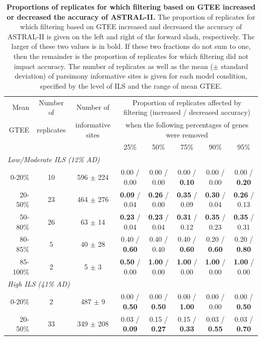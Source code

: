 \begin{landscape}
\begin{table}[!h]
\caption{{\bf Proportions of replicates for which filtering based on GTEE increased or decreased the accuracy of ASTRAL-II.} The proportion of replicates for which filtering based on GTEE increased and decreased the accuracy of ASTRAL-II is given on the left and right of the forward slash, respectively. The larger of these two values is in bold. If these two fractions do not sum to one, then the remainder is the proportion of replicates for which filtering did not impact accuracy. The number of replicates as well as the mean ($\pm$ standard deviation) of parsimony informative sites is given for each model condition, specified by the level of ILS and the range of mean GTEE.
}\label{tab:include-2}
\centering
\footnotesize
\begin{tabular}{rc cccccc}
\toprule
Mean & Number of & Number of & \multicolumn{5}{c}{Proportion of replicates affected by filtering (increased / decreased accuracy)} \\[0.5ex]
GTEE & replicates & informative sites & \multicolumn{5}{c}{when the following percentages of genes were removed}\\\cmidrule{4-8}
& & & 25\% & 50\% & 75\% & 90\% & 95\% \\
\midrule
\multicolumn{8}{l}{\em Low/Moderate ILS (12\% AD)}\\[0.5ex]
0-20\%  & 10 & 596 $\pm$ 224  & 0.00 / 0.00 & 0.00 / 0.00 & 0.00 / {\bf 0.10} & 0.00 / 0.00 & 0.00 / {\bf 0.20} \\[0.5ex]
20-50\%  & 23 & 464 $\pm$ 276  & {\bf 0.09} / 0.04 & {\bf 0.26} / 0.00 & {\bf 0.35} / 0.09 & {\bf 0.30} / 0.04 & {\bf 0.26} / 0.13 \\[0.5ex]
50-80\%  & 26 & 63 $\pm$ 14  & {\bf 0.23} / 0.04 & {\bf 0.23} / 0.04 & {\bf 0.31} / 0.12 & {\bf 0.35} / 0.23 & {\bf 0.35} / 0.31 \\[0.5ex]
80-85\%  & 5 & 40 $\pm$ 28  & 0.40 / {\bf 0.60} & 0.40 / 0.40 & 0.40 / {\bf 0.60} & 0.20 / {\bf 0.60} & 0.20 / {\bf 0.80} \\[0.5ex]
85-100\%  & 2 & 5 $\pm$ 3  & {\bf 0.50} / 0.00 & {\bf 1.00} / 0.00 & {\bf 1.00} / 0.00 & {\bf 1.00} / 0.00 & {\bf 1.00} / 0.00 \\[2ex]
\multicolumn{8}{l}{\em High ILS (41\% AD)}\\[0.5ex]
0-20\%  & 2 & 487 $\pm$ 9  & 0.00 / {\bf 0.50} & 0.00 / {\bf 0.50} & 0.00 / {\bf 1.00} & 0.00 / 0.00 & 0.00 / {\bf 0.50} \\[0.5ex]
20-50\%  & 33 & 349 $\pm$ 208  & 0.03 / {\bf 0.09} & 0.15 / {\bf 0.27} & 0.15 / {\bf 0.33} & 0.03 / {\bf 0.55} & 0.03 / {\bf 0.70} \\[0.5ex]

\end{tabular}
\end{table}
\end{landscape}
